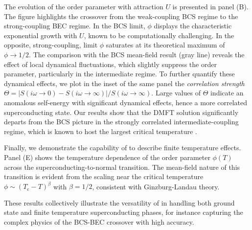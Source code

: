 \documentclass[edipack_sp.tex]{subfiles}
\begin{document}
The evolution of the order parameter with attraction $U$ is presented in panel (B). The figure  
highlights the crossover from the weak-coupling BCS regime to the 
strong-coupling BEC regime. In the BCS limit, $\phi$ displays the 
characteristic exponential growth with $U$, known to be 
computationally challenging. In the opposite, strong-coupling, limit 
$\phi$ saturates at its theoretical maximum of $\phi \rightarrow 1/2$. The comparison with the BCS mean-field result 
(gray line) reveals the effect of local dynamical fluctuations, which  slightly suppress the order parameter, particularly in the intermediate regime. 
To further quantify these dynamical effects, we plot in the inset of the same panel the 
{\it correlation strength}~\cite{Amaricci2015PRL,Amaricci2016PRB}
$\Theta=|S(i\omega\to 0)-S(i\omega\to\infty)|/S(i\omega\to\infty)$. 
Large values of $\Theta$ indicate an anomalous self-energy with 
significant dynamical effects, hence a more correlated superconducting state.
Our results show that the DMFT solution significantly departs from the BCS picture in the strongly correlated intermediate-coupling regime, which is known to host the largest critical temperature \cite{Toschi2005NJP,Toschi2005PRB}.

Finally, we demonstrate the capability of \NAME to describe finite 
temperature effects. Panel (E) shows the temperature dependence of 
the order parameter $\phi(T)$ across the superconducting-to-normal 
transition. The mean-field nature of this transition is evident from 
the scaling near the critical temperature 
$\phi \sim (T_\mathrm{c} - T)^\beta$ with $\beta = 1/2$, consistent 
with  Ginzburg-Landau theory.

These results collectively illustrate the versatility of \NAME in 
handling both ground state and finite temperature superconducting 
phases, for instance capturing the complex physics of the BCS-BEC crossover with high accuracy.
\end{document}

